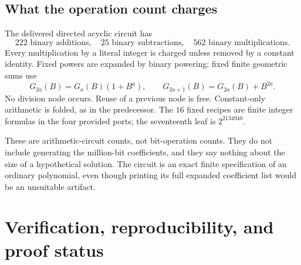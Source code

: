 \documentclass[11pt,a4paper]{article}
\theoremstyle{remark}
\begin{document}
\subsection{What the operation count charges}
The delivered directed acyclic circuit has
\[
222\text{ binary additions},\quad
25\text{ binary subtractions},\quad
562\text{ binary multiplications}.
\]
Every multiplication by a literal integer is charged unless
removed by a constant identity. Fixed powers are expanded by
binary powering; fixed finite geometric sums use
\[
G_{2a}(B)=G_a(B)(1+B^a),\qquad
G_{2a+1}(B)=G_{2a}(B)+B^{2a}.
\]
No division node occurs. Reuse of a previous node is free.
Constant-only arithmetic is folded, as in the predecessor.
The \(16\) fixed recipes are finite integer formulas in the four
provided ports; the seventeenth leaf is \(2^{2134940}\).

These are arithmetic-circuit counts, not bit-operation counts.
They do not include generating the million-bit coefficients,
and they say nothing about the size of a hypothetical solution.
The circuit is an exact finite specification of an ordinary
polynomial, even though printing its full expanded coefficient
list would be an unsuitable artifact.

\section{Verification, reproducibility, and proof status}\label{sec:checks}
\end{document}
